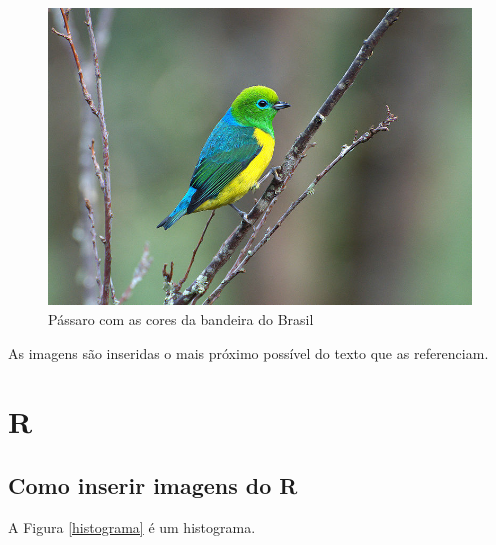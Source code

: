 \documentclass[
	12pt,				%
	oneside,			%
	a4paper,			%
	english,			%
	french,				%
	spanish,			%
	brazil				%
	]{abntex2}
\begin{document}
\begin{figure}[htbp]
\hypertarget{passaro}{%
\caption{Pássaro com as cores da bandeira do Brasil}\label{passaro}
\begin{center}
\includegraphics[scale=0.4]{imagens/passaro.jpg}
\end{center}
}
\end{figure}

As imagens são inseridas o mais próximo possível do texto que as
referenciam.

\hypertarget{r}{%
\section{R}\label{r}}

\hypertarget{como-inserir-imagens-do-r}{%
\subsection{Como inserir imagens do R}\label{como-inserir-imagens-do-r}}

A Figura \ref{histograma} é um histograma.
\end{document}

